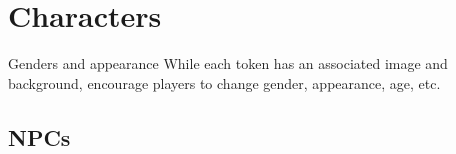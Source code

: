 \chapter{Characters}


\begin{rpg-warnbox}{Genders and appearance}
    While each token has an associated image and background, encourage players to change gender, appearance, age, etc.
\end{rpg-warnbox}




\clearpage


\section{NPCs}




